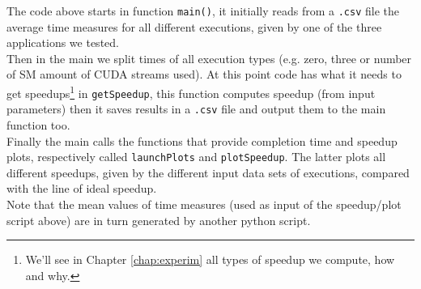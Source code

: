 	The code above starts in function \texttt{main()}, it initially reads from a \texttt{.csv} file the average time measures for all different executions, given by one of the three applications we tested.\\
	Then in the main we split times of all execution types (e.g. zero, three or number of SM amount of CUDA streams used). At this point code has what it needs to get speedups\footnote{We'll see in Chapter \ref{chap:experim} all types of speedup we compute, how and why.} in \texttt{getSpeedup}, this function computes speedup (from input parameters) then it saves results in a \texttt{.csv} file and output them to the main function too.\\
	Finally the main calls the functions that provide completion time and speedup plots, respectively called \texttt{launchPlots} and \texttt{plotSpeedup}. The latter plots all different speedups, given by the different input data sets of executions, compared with the line of ideal speedup.\\
	Note that the mean values of time measures (used as input of the speedup/plot script above) are in turn generated by another python script.
	

